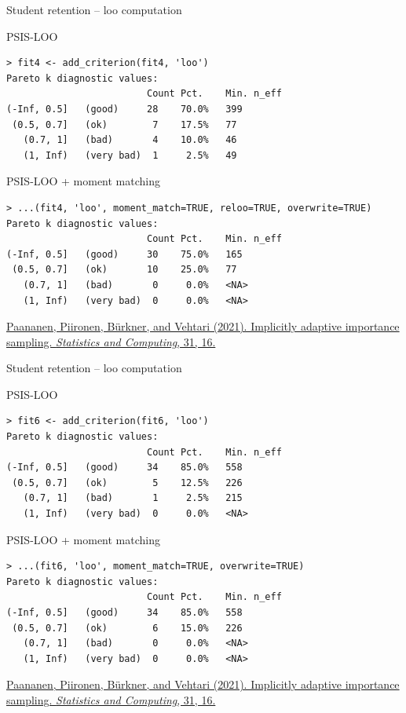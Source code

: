 \documentclass[english,t]{beamer}
\begin{document}
\begin{frame}[fragile]{Student retention -- loo computation}

PSIS-LOO

{\scriptsize
\begin{lstlisting}
> fit4 <- add_criterion(fit4, 'loo')
Pareto k diagnostic values:
                         Count Pct.    Min. n_eff
(-Inf, 0.5]   (good)     28    70.0%   399       
 (0.5, 0.7]   (ok)        7    17.5%   77        
   (0.7, 1]   (bad)       4    10.0%   46        
   (1, Inf)   (very bad)  1     2.5%   49        
\end{lstlisting}}

PSIS-LOO + moment matching  
{\scriptsize
\begin{lstlisting}
> ...(fit4, 'loo', moment_match=TRUE, reloo=TRUE, overwrite=TRUE)
Pareto k diagnostic values:
                         Count Pct.    Min. n_eff
(-Inf, 0.5]   (good)     30    75.0%   165       
 (0.5, 0.7]   (ok)       10    25.0%   77        
   (0.7, 1]   (bad)       0     0.0%   <NA>      
   (1, Inf)   (very bad)  0     0.0%   <NA>      
\end{lstlisting}}

  \vspace{0.5\baselineskip}
{\color{gray}\footnotesize\href{https://doi.org/10.1007/s11222-020-09982-2}{Paananen, Piironen, Bürkner, and Vehtari (2021). Implicitly adaptive importance sampling. \textit{Statistics and Computing}, 31, 16.}}
  
\end{frame}

\begin{frame}[fragile]{Student retention -- loo computation}

PSIS-LOO

{\scriptsize
\begin{lstlisting}
> fit6 <- add_criterion(fit6, 'loo')
Pareto k diagnostic values:
                         Count Pct.    Min. n_eff
(-Inf, 0.5]   (good)     34    85.0%   558       
 (0.5, 0.7]   (ok)        5    12.5%   226       
   (0.7, 1]   (bad)       1     2.5%   215       
   (1, Inf)   (very bad)  0     0.0%   <NA>
\end{lstlisting}}

PSIS-LOO + moment matching  
{\scriptsize
\begin{lstlisting}
> ...(fit6, 'loo', moment_match=TRUE, overwrite=TRUE)
Pareto k diagnostic values:
                         Count Pct.    Min. n_eff
(-Inf, 0.5]   (good)     34    85.0%   558       
 (0.5, 0.7]   (ok)        6    15.0%   226       
   (0.7, 1]   (bad)       0     0.0%   <NA>      
   (1, Inf)   (very bad)  0     0.0%   <NA>      
\end{lstlisting}}
  
  \vspace{0.5\baselineskip}
{\color{gray}\footnotesize\href{https://doi.org/10.1007/s11222-020-09982-2}{Paananen, Piironen, Bürkner, and Vehtari (2021). Implicitly adaptive importance sampling. \textit{Statistics and Computing}, 31, 16.}}
\end{frame}
\end{document}
